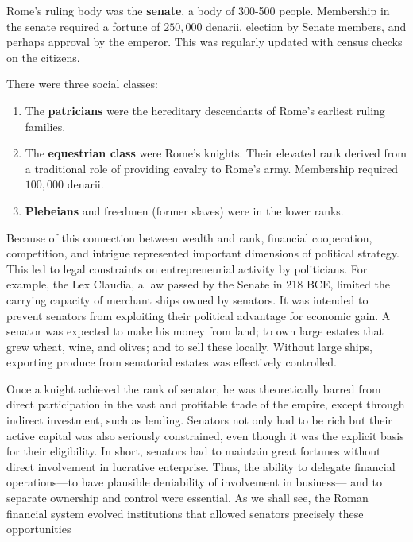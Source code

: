 \documentclass{article}
\begin{document}
    \begin{politics}[Senate]
      Rome's ruling body was the \textbf{senate}, a body of 300-500 people. Membership in the senate required a fortune of $250,000$ denarii, election by Senate members, and perhaps approval by the emperor. This was regularly updated with census checks on the citizens. 
    \end{politics}

    \begin{society}
      There were three social classes:
      \begin{enumerate}
        \item The \textbf{patricians} were the hereditary descendants of Rome's earliest ruling families. 
        \item The \textbf{equestrian class} were Rome's knights. Their elevated rank derived from a traditional role of providing cavalry to Rome's army. Membership required $100,000$ denarii. 
        \item \textbf{Plebeians} and freedmen (former slaves) were in the lower ranks. 
      \end{enumerate}
    \end{society}

    Because of this connection between wealth and rank, financial cooperation, competition, and intrigue represented important dimensions of political strategy. This led to legal constraints on entrepreneurial activity by politicians. For example, the Lex Claudia, a law passed by the Senate in 218 BCE, limited the carrying capacity of merchant ships owned by senators. It was intended to prevent senators from exploiting their political advantage for economic gain. A senator was expected to make his money from land; to own large estates that grew wheat, wine, and olives; and to sell these locally. Without large ships, exporting produce from senatorial estates was effectively controlled.

    Once a knight achieved the rank of senator, he was theoretically barred from direct participation in the vast and profitable trade of the empire, except through indirect investment, such as lending. Senators not only had to be rich but their active capital was also seriously constrained, even though it was the explicit basis for their eligibility. In short, senators had to maintain great fortunes without direct involvement in lucrative enterprise. Thus, the ability to delegate financial operations—to have plausible deniability of involvement in business— and to separate ownership and control were essential. As we shall see, the Roman financial system evolved institutions that allowed senators precisely these opportunities
\end{document}
